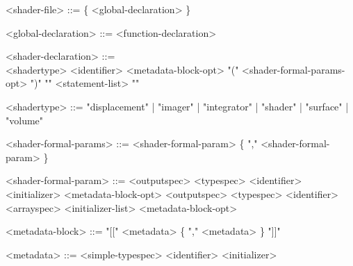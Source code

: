 \documentclass[11pt,letterpaper]{book}
\begin{document}
\begin{grammar}
<shader-file> ::= \{ <global-declaration> \}

<global-declaration> ::= <function-declaration> 

<shader-declaration> ::= \spc \\ 
    <shadertype> <identifier> <metadata-block-opt> 
    "(" <shader-formal-params-opt> ")" "{" <statement-list> "}"

<shadertype> ::= "displacement" | "imager" | "integrator" | 
    "shader" | "surface" | "volume"

<shader-formal-params> ::= <shader-formal-param> \{ "," <shader-formal-param> \}

<shader-formal-param> ::= <outputspec> <typespec> <identifier>
                               <initializer> <metadata-block-opt>
\alt <outputspec> <typespec> <identifier> <arrayspec>
          <initializer-list> <metadata-block-opt>

<metadata-block> ::= "[[" <metadata> \{ "," <metadata> \} "]]"

<metadata> ::= <simple-typespec> <identifier> <initializer>

\end{grammar}
\end{document}
